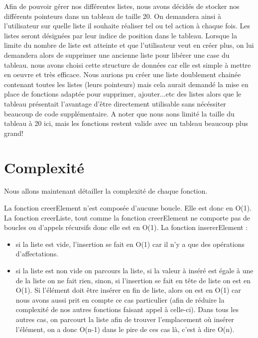 \documentclass[11pt]{report}
\begin{document}
\medskip

Afin de pouvoir gérer nos différentes listes, nous avons décidés de stocker nos différents pointeurs dans un tableau de taille 20. On demandera ainsi à l'utilisateur sur quelle liste il souhaite réaliser tel ou tel action à chaque fois. Les listes seront désignées par leur indice de position dans le tableau. Lorsque la limite du nombre de liste est atteinte et que l'utilisateur veut en créer plus, on lui demandera alors de supprimer une ancienne liste pour libérer une case du tableau. nous avons choisi cette structure de données car elle est simple à mettre en oeuvre et très efficace. Nous aurions pu créer une liste doublement chainée contenant toutes les listes (leurs pointeurs) mais cela aurait demandé la mise en place de fonctions adaptée pour supprimer, ajouter...etc des listes alors que le tableau présentait l'avantage d'être directement utilisable sans nécéssiter beaucoup de code supplémentaire. A noter que nous aons limité la taille du tableau à 20 ici, mais les fonctions restent valide avec un tableau beaucoup plus grand!

\section{Complexité}

Nous allons maintenant détailler la complexité de chaque fonction.

\medskip

La fonction creerElement n'est composée d'aucune boucle. Elle est donc en O(1).
\medskip
La fonction creerListe, tout comme la fonction creerElement ne comporte pas de boucles ou d'appels récursifs donc elle est en O(1).
\medskip
La fonction insererElement :
\begin{itemize}
	\item si la liste est vide, l'insertion se fait en O(1) car il n'y a que des opérations d'affectations.
	\item si la liste est non vide on parcours la liste, si la valeur à inséré est égale à une de la liste on ne fait rien, sinon, si l'insertion se fait en tête de liste on est en O(1). Si l'élément doit être insérer en fin de liste, alors on est en O(1) car nous avons aussi prit en compte ce cas particulier (afin de réduire la complexité de nos autres fonctions faisant appel à celle-ci). Dans tous les autres cas, on parcourt la liste afin de trouver l'emplacement où insérer l'élément, on a donc O(n-1) dans le pire de ces cas là, c'est à dire O(n).
	
\end{itemize}
\end{document}
